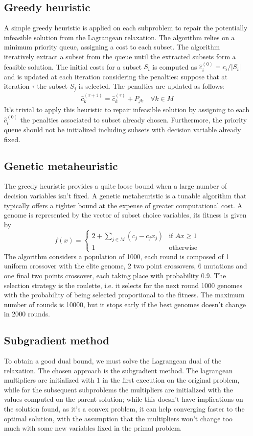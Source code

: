 \documentclass[a4paper]{article}
\begin{document}
\subsection{Greedy heuristic}
A simple greedy heuristic is applied on each subproblem to repair the potentially infeasible solution from the Lagrangean relaxation. The algorithm relies on a minimum priority queue, assigning a cost to each subset. The algorithm iteratively extract a subset from the queue until the extracted subsets form a feasible solution. The initial costs for a subset $S_i$ is computed as $\hat c_i^{(0)} = c_i/|S_i|$ and is updated at each iteration considering the penalties: suppose that at iteration $\tau$ the subset $S_j$ is selected. The penalties are updated as follows:
\begin{align*}
	\hat c_k^{(\tau+1)} = \hat c_k^{(\tau)} + P_{jk} \quad \forall k \in M	
\end{align*}
It's trivial to apply this heuristic to repair infeasible solution by assigning to each $\hat c_i^{(0)}$ the penalties associated to subset already chosen. Furthermore, the priority queue should not be initialized including subsets with decision variable already fixed.

\subsection{Genetic metaheuristic}
The greedy heuristic provides a quite loose bound when a large number of decision variables isn't fixed. A genetic metaheuristic is a tunable algorithm that typically offers a tighter bound at the expense of greater computational cost.
A genome is represented by the vector of subset choice variables, its fitness is given by
$$
f(x) = 
\begin{cases}
	2 + \sum_{j\in M} (c_j - c_j x_j) & \text{if } Ax \geq 1\\
	1 & \text{otherwise}
\end{cases}
$$
The algorithm considers a population of 1000, each round is composed of 1 uniform crossover with the elite genome, 2 two point crossovers, 6 mutations and one final two points crossover, each taking place with probability 0.9. The selection strategy is the roulette, i.e. it selects for the next round 1000 genomes with the probability of being selected proportional to the fitness. The maximum number of rounds is 10000, but it stops early if the best genomes doesn't change in 2000 rounds.

\subsection{Subgradient method}
To obtain a good dual bound, we must solve the Lagrangean dual of the relaxation. The chosen approach is the subgradient method. The lagrangean multipliers are initialized with 1 in the first execution on the original problem, while for the subsequent subproblems the multipliers are initialized with the values computed on the parent solution; while this doesn't have implications on the solution found, as it's a convex problem, it can help converging faster to the optimal solution, with the assumption that the multipliers won't change too much with some new variables fixed in the primal problem.
\end{document}
